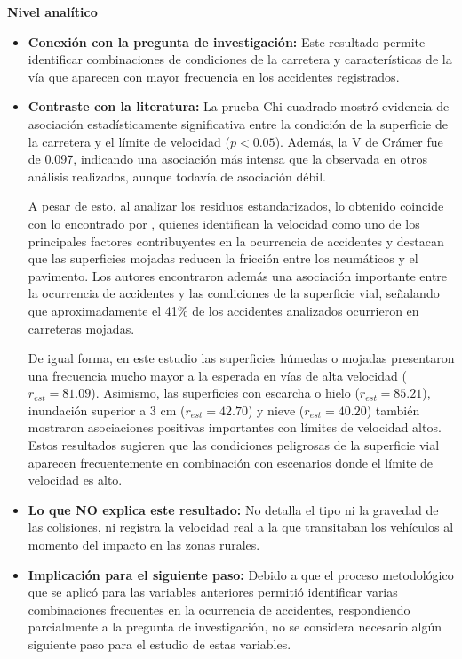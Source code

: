 \documentclass[12pt]{article}
\begin{document}
\textbf{Nivel analítico}

\begin{itemize}
    \item \textbf{Conexión con la pregunta de investigación:} 
    Este resultado permite identificar combinaciones de condiciones de la carretera y características de la vía que aparecen con 
    mayor frecuencia en los accidentes registrados. 
    \item \textbf{Contraste con la literatura:}
    La prueba Chi-cuadrado mostró evidencia de asociación estadísticamente significativa entre la condición de la superficie de la carretera 
    y el límite de velocidad ($p<0.05$). Además, la V de Crámer fue de 0.097, indicando una asociación más intensa que la observada en otros 
    análisis realizados, aunque todavía de asociación débil.

    A pesar de esto, al analizar los residuos estandarizados, lo obtenido coincide con lo encontrado por \textcite{KARZAN2017}, 
    quienes identifican la velocidad como uno de los principales factores contribuyentes en la ocurrencia de accidentes y destacan que las superficies mojadas reducen la fricción entre los neumáticos 
    y el pavimento. Los autores encontraron además una asociación importante entre la ocurrencia de accidentes y las condiciones de la 
    superficie vial, señalando que aproximadamente el 41\% de los accidentes analizados ocurrieron en carreteras mojadas.

    De igual forma, en este estudio las superficies húmedas o mojadas presentaron una frecuencia mucho mayor a la esperada en vías de alta 
    velocidad ($r_{est}=81.09$). Asimismo, las superficies con escarcha o hielo ($r_{est}=85.21$), inundación superior a 3 cm ($r_{est}=42.70$) 
    y nieve ($r_{est}=40.20$) también mostraron asociaciones positivas importantes con límites de velocidad altos. Estos resultados sugieren que 
    las condiciones peligrosas de la superficie vial aparecen frecuentemente en combinación con escenarios donde el límite de velocidad es alto.

    \item \textbf{Lo que NO explica este resultado:} No detalla el tipo ni la gravedad de las colisiones, 
	ni registra la velocidad real a la que transitaban los vehículos al momento del impacto en las zonas rurales.
    
    \item \textbf{Implicación para el siguiente paso:} Debido a que el proceso metodológico que se aplicó para las variables anteriores permitió
    identificar varias combinaciones frecuentes en la ocurrencia de accidentes, respondiendo parcialmente a la pregunta de investigación, no se considera
    necesario algún siguiente paso para el estudio de estas variables.
\end{itemize}
\end{document}
